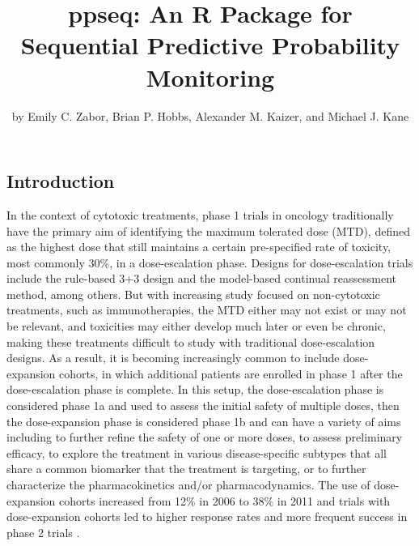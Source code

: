 \title{ppseq: An R Package for Sequential Predictive Probability Monitoring}
\author{by Emily C. Zabor, Brian P. Hobbs, Alexander M. Kaizer, and Michael J. Kane}

\maketitle


\hypertarget{introduction}{%
\subsection{Introduction}\label{introduction}}

In the context of cytotoxic treatments, phase 1 trials in oncology
traditionally have the primary aim of identifying the maximum tolerated
dose (MTD), defined as the highest dose that still maintains a certain
pre-specified rate of toxicity, most commonly 30\%, in a dose-escalation
phase. Designs for dose-escalation trials include the rule-based 3+3
design and the model-based continual reassessment method, among others.
But with increasing study focused on non-cytotoxic treatments, such as
immunotherapies, the MTD either may not exist or may not be relevant,
and toxicities may either develop much later or even be chronic, making
these treatments difficult to study with traditional dose-escalation
designs. As a result, it is becoming increasingly common to include
dose-expansion cohorts, in which additional patients are enrolled in
phase 1 after the dose-escalation phase is complete. In this setup, the
dose-escalation phase is considered phase 1a and used to assess the
initial safety of multiple doses, then the dose-expansion phase is
considered phase 1b and can have a variety of aims including to further
refine the safety of one or more doses, to assess preliminary efficacy,
to explore the treatment in various disease-specific subtypes that all
share a common biomarker that the treatment is targeting, or to further
characterize the pharmacokinetics and/or pharmacodynamics. The use of
dose-expansion cohorts increased from 12\% in 2006 to 38\% in 2011
\citep{Manji2013} and trials with dose-expansion cohorts led to higher
response rates and more frequent success in phase 2 trials
\citep{Bugano2017}.

